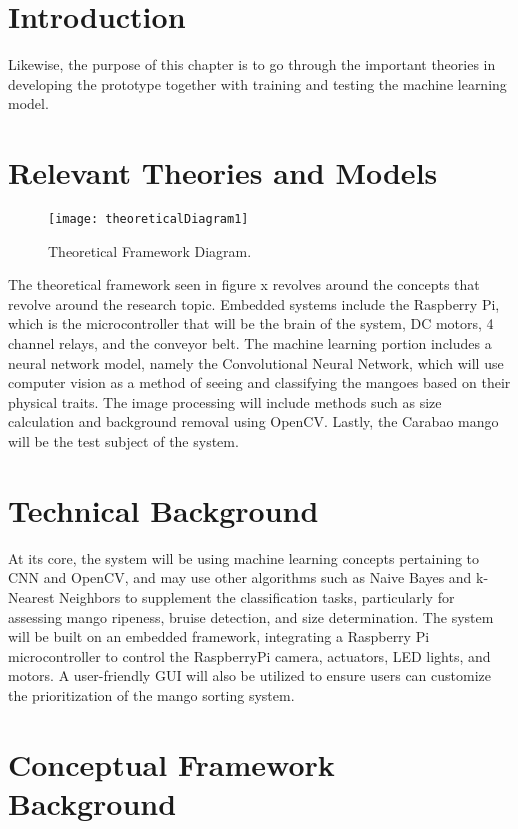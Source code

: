 

\section{Introduction}

Likewise, the purpose of this chapter is to go through the important theories in developing the prototype together with training and testing the machine learning model.

\section{Relevant Theories and Models}

\begin{figure}[!htbp]
	\centering
	\texttt{[image: theoreticalDiagram1]}
	\caption{Theoretical Framework Diagram.}
	\label{fig:theoreticalDiagram1}
\end{figure}


The theoretical framework seen in figure x revolves around the concepts that revolve around the research topic. Embedded systems include the Raspberry Pi, which is the microcontroller that will be the brain of the system, DC motors, 4 channel relays, and the conveyor belt. The machine learning portion includes a neural network model, namely the Convolutional Neural Network, which will use computer vision as a method of seeing and classifying the mangoes based on their physical traits. The image processing will include methods such as size calculation and background removal using OpenCV. Lastly, the Carabao mango will be the test subject of the system.

\section{Technical Background}

At its core, the system will be using machine learning concepts pertaining to CNN and OpenCV, and may use other algorithms such as Naive Bayes and k-Nearest Neighbors to supplement the classification tasks, particularly for assessing mango ripeness, bruise detection, and size determination. The system will be built on an embedded framework, integrating a Raspberry Pi microcontroller to control the RaspberryPi camera, actuators, LED lights, and motors. A user-friendly GUI will also be utilized to ensure users can customize the prioritization of the mango sorting system.

\section{Conceptual Framework Background}



